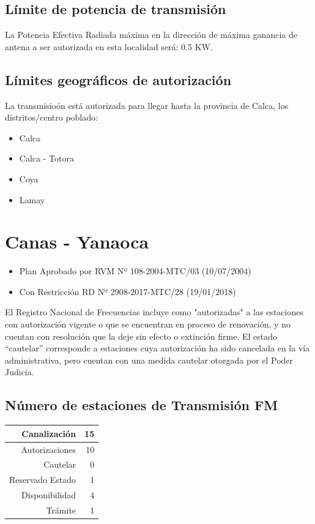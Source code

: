 \documentclass[11pt]{article}
\begin{document}
\subsection{Límite de potencia de transmisión}

La Potencia Efectiva Radiada máxima en la dirección de máxima ganancia de antena a ser autorizada en esta localidad será: 0.5 KW.

\subsection{Límites geográficos de autorización}

La transmisioón está autorizada para llegar hasta la provincia de Calca, los distritos/centro poblado:

\begin{itemize}
	\item Calca
	\item Calca - Totora
	\item Coya
	\item Lamay
\end{itemize}


\section{Canas - Yanaoca}

\begin{itemize}
	\item Plan Aprobado por RVM Nº 108-2004-MTC/03 (10/07/2004)
	\item Con Restricción RD Nº 2908-2017-MTC/28 (19/01/2018)
\end{itemize}

El Registro Nacional de Frecuencias incluye como "autorizadas" a las estaciones con autorización vigente o que se encuentran en proceso de renovación, y no cuentan con resolución que la deje sin efecto o extinción firme. El estado “cautelar” corresponde a estaciones cuya autorización ha sido cancelada en la vía administrativa, pero cuentan con una medida cautelar otorgada por el Poder Judicia.

\subsection{Número de estaciones de Transmisión FM}

\begin{tabular}{|r|r|} \hline
	Canalización 			& 15 \\ \hline
	Autorizaciones			& 10 \\ \hline
	Cautelar				& 0 \\ \hline
	Reservado Estado		& 1 \\ \hline
	Disponibilidad			& 4 \\ \hline
	Trámite					& 1 \\ \hline 
\end{tabular}
\end{document}

